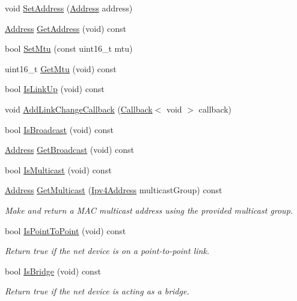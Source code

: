 \begin{DoxyCompactItemize}
void \hyperlink{classns3_1_1WifiNetDevice_ae08e31b9299772498c168be4208f18fb}{Set\+Address} (\hyperlink{classns3_1_1Address}{Address} address)
\item 
\hyperlink{classns3_1_1Address}{Address} \hyperlink{classns3_1_1WifiNetDevice_a77fc34ff26c7af715b8ad1050aeb90ea}{Get\+Address} (void) const 
\item 
bool \hyperlink{classns3_1_1WifiNetDevice_a56430a4ab8018bdb09cf48e0b7bff396}{Set\+Mtu} (const uint16\+\_\+t mtu)
\item 
uint16\+\_\+t \hyperlink{classns3_1_1WifiNetDevice_a756390688e2b5a279414d41ce5eaa3c9}{Get\+Mtu} (void) const 
\item 
bool \hyperlink{classns3_1_1WifiNetDevice_a132922d422f2a32e5b5b499b58068fac}{Is\+Link\+Up} (void) const 
\item 
void \hyperlink{classns3_1_1WifiNetDevice_ade74f6040652546bec8fdff91ae76025}{Add\+Link\+Change\+Callback} (\hyperlink{classns3_1_1Callback}{Callback}$<$ void $>$ callback)
\item 
bool \hyperlink{classns3_1_1WifiNetDevice_af05db995cee862e79d787d5cf6aa3edc}{Is\+Broadcast} (void) const 
\item 
\hyperlink{classns3_1_1Address}{Address} \hyperlink{classns3_1_1WifiNetDevice_a1f57fa65d2e877ab6ea7739d34de2abb}{Get\+Broadcast} (void) const 
\item 
bool \hyperlink{classns3_1_1WifiNetDevice_a5147f0411c79044bdced20b96bcad663}{Is\+Multicast} (void) const 
\item 
\hyperlink{classns3_1_1Address}{Address} \hyperlink{classns3_1_1WifiNetDevice_ae3c5a8284208fe1ca2d31cb5a2b900a3}{Get\+Multicast} (\hyperlink{classns3_1_1Ipv4Address}{Ipv4\+Address} multicast\+Group) const 
\begin{DoxyCompactList}\small\item\em Make and return a M\+AC multicast address using the provided multicast group. \end{DoxyCompactList}\item 
bool \hyperlink{classns3_1_1WifiNetDevice_a5267bf0260313460432d29033a5be59b}{Is\+Point\+To\+Point} (void) const 
\begin{DoxyCompactList}\small\item\em Return true if the net device is on a point-\/to-\/point link. \end{DoxyCompactList}\item 
bool \hyperlink{classns3_1_1WifiNetDevice_ab30e77fbda8f825be4d15e763539fd9e}{Is\+Bridge} (void) const 
\begin{DoxyCompactList}\small\item\em Return true if the net device is acting as a bridge. \end{DoxyCompactList}\item 

\end{DoxyCompactItemize}
